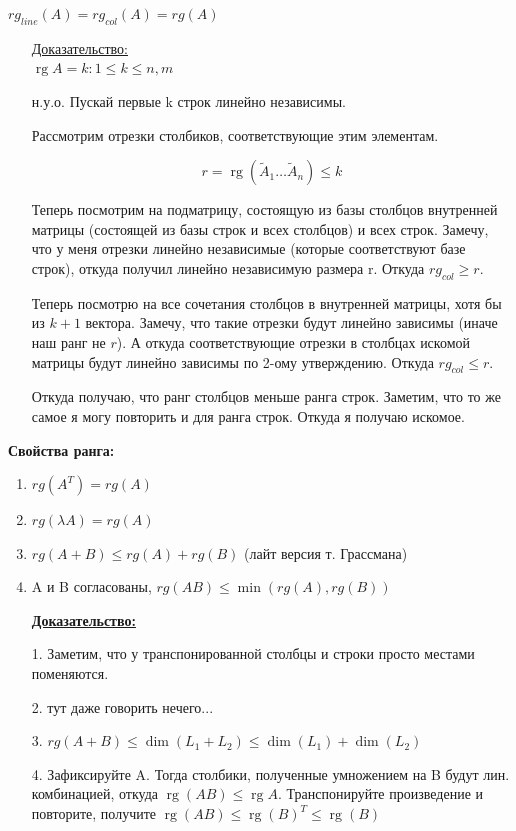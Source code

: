 \documentclass[twoside]{book}
\DeclareMathOperator{\rg}{rg}
\newcommand{\prooff}[1]{{\underline{Доказательство:}} \\ }
\begin{document}
\( rg_{line}(A) = rg_{col}(A) = rg(A) \)
\begin{enumerate}
    \item[] \prooff{}
          $\rg A = k: 1 \leq k \leq n,m$

          н.у.о. Пускай первые k строк линейно независимы.

          Рассмотрим отрезки столбиков, соответствующие этим элементам.

          $$r = \rg (\widetilde{A}_1 \ldots \widetilde{A}_n) \leq k$$

          Теперь посмотрим на подматрицу, состоящую из базы столбцов внутренней матрицы (состоящей из базы строк и всех столбцов) и всех строк. Замечу, что у меня отрезки линейно независимые (которые соответствуют базе строк), откуда получил линейно независимую размера r. Откуда $rg_{col}\geq r$.

          Теперь посмотрю на все сочетания столбцов в внутренней матрицы, хотя бы из $k+1$ вектора. Замечу, что такие отрезки будут линейно зависимы (иначе наш ранг не $r$). А откуда соответствующие отрезки в столбцах искомой матрицы будут линейно зависимы по 2-ому утверждению. Откуда $rg_{col}\leq r$.

          Откуда получаю, что ранг столбцов меньше ранга строк. Заметим, что то же самое я могу повторить и для ранга строк. Откуда я получаю искомое.
\end{enumerate}

\textbf{Свойства ранга:}
\begin{enumerate}
    \item $ rg(A^T) = rg(A) $
    \item $ rg(\lambda A) = rg(A) $
    \item $ rg(A+B) \leq rg(A)+rg(B) $ (лайт версия т. Грассмана)
    \item A и B согласованы, $ rg(AB) \leq \min(rg(A),rg(B)) $
\end{enumerate}
\begin{enumerate}
    \item[] \textbf{\uline{Доказательство:}}
    \item[1.] Заметим, что у транспонированной столбцы и строки просто местами поменяются.
    \item[2.] тут даже говорить нечего...
    \item[3.] $rg(A+B) \leq \dim(L_1 + L_2) \leq \dim(L_1) +\dim(L_2)$
    \item[4.] Зафиксируйте A. Тогда столбики, полученные умножением на B будут лин. комбинацией, откуда $\rg (AB)\leq\rg A$. Транспонируйте произведение и повторите, получите $\rg (AB)\leq\rg (B)^T\leq \rg(B)$
\end{enumerate}
\end{document}

